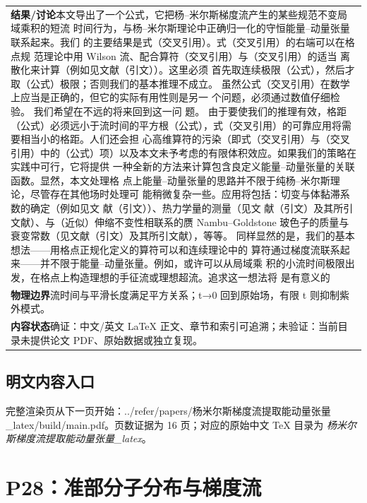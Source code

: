 \documentclass[UTF8,11pt,oneside]{ctexbook}
\begin{document}
\begin{table}[htbp]
\begin{tabular}{@{}p{}@{}}
    \textbf{结果/讨论}\quad 本文导出了一个公式，它把杨–米尔斯梯度流产生的某些规范不变局域乘积的短流 时间行为，与杨–米尔斯理论中正确归一化的守恒能量–动量张量联系起来。我们 的主要结果是式（交叉引用）。式（交叉引用）的右端可以在格点规 范理论中用 Wilson 流、配合算符（交叉引用）与（交叉引用）的适当 离散化来计算（例如见文献（引文））。这里必须 首先取连续极限（公式），然后才取（公式）极限；否则我们的基本推理不成立。 虽然公式（交叉引用）在数学上应当是正确的，但它的实际有用性则是另一 个问题，必须通过数值仔细检验。 我们希望在不远的将来回到这一问 题。 由于要使我们的推理有效，格距（公式）必须远小于流时间的平方根（公式），式（交叉引用）的可靠应用将需要相当小的格距。人们还会担 心高维算符的污染（即式（交叉引用）与（交叉引用）中的（公式）项）以及本文未予考虑的有限体积效应。如果我们的策略在实践中可行，它将提供 一种全新的方法来计算包含良定义能量–动量张量的关联函数。显然，本文处理格 点上能量–动量张量的思路并不限于纯杨–米尔斯理论，尽管存在其他场时处理可 能稍微复杂一些。应用将包括：切变与体黏滞系数的确定（例如见文 献（引文））、热力学量的测量（见文 献（引文）及其所引文献）、与（近似）伸缩不变性相联系的赝 Nambu–Goldstone 玻色子的质量与衰变常数（见文献（引文）及其所引文献），等等。 同样显然的是，我们的基本想法——用格点正规化定义的算符可以和连续理论中的 算符通过梯度流联系起来——并不限于能量–动量张量。例如，或许可以从局域乘 积的小流时间极限出发，在格点上构造理想的手征流或理想超流。追求这一想法将 是有意义的 \\
    \textbf{物理边界}\quad 流时间与平滑长度满足平方关系；t→0 回到原始场，有限 t 则抑制紫外模式。 \\
    \textbf{内容状态}\quad 确证：中文/英文 LaTeX 正文、章节和索引可追溯；未验证：当前目录未提供论文 PDF、原始数据或独立复现。 \\
    \bottomrule
  \end{tabular}
\end{table}
\section*{明文内容入口}
\noindent 完整渲染页从下一页开始：../\allowbreak{}refer/\allowbreak{}papers/\allowbreak{}杨米尔斯梯度流提取能动量张量\_\allowbreak{}latex/\allowbreak{}build/\allowbreak{}main.pdf。页数证据为 16 页；对应的原始中文 TeX 目录为 \emph{杨米尔斯梯度流提取能动量张量\_latex}。
\clearpage

\clearpage

\chapter{P28：准部分子分布与梯度流}
\end{document}
